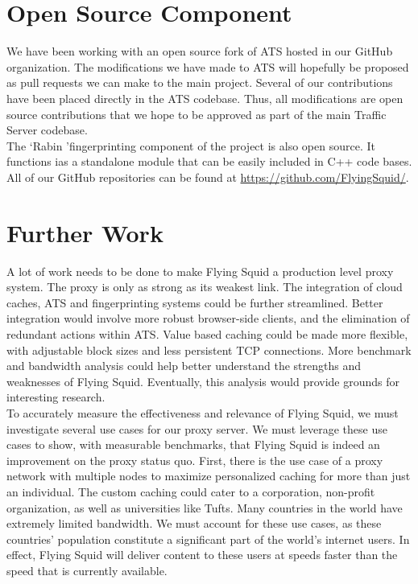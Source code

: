 
\section{Open Source Component}

\noindent
We have been working with an open source fork of ATS hosted in our GitHub organization. The modifications we have made to ATS will hopefully be proposed as pull requests we can make to the main project. Several of our contributions have been placed directly in the ATS codebase. Thus, all modifications are open source contributions that we hope to be approved as part of the main Traffic Server codebase. \\

\noindent
The \lq Rabin \rq fingerprinting component of the project is also open source. It functions ias a standalone module that can be easily included in C++ code bases.\\

\noindent
All of our GitHub repositories can be found at \url{https://github.com/FlyingSquid/}.

\section{Further Work}

\noindent
A lot of work needs to be done to make Flying Squid a production level proxy system. The proxy is only as strong as its weakest link. The integration of cloud caches, ATS and fingerprinting systems could be further streamlined. Better integration would involve more robust browser-side clients, and the elimination of redundant actions within ATS. Value based caching could be made more flexible, with adjustable block sizes and less persistent TCP connections. More benchmark and bandwidth analysis could help better understand the strengths and weaknesses of Flying Squid. Eventually, this analysis would provide grounds for interesting research.\\

\noindent
To accurately measure the effectiveness and relevance of Flying Squid, we must investigate several use cases for our proxy server. We must leverage these use cases to show, with measurable benchmarks, that Flying Squid is indeed an improvement on the proxy status quo. First, there is the use case of a proxy network with multiple nodes to maximize personalized caching for more than just an individual. The custom caching could cater to a corporation, non-profit organization, as well as universities like Tufts. 
Many countries in the world have extremely limited bandwidth. We must account for these use cases, as these countries’ population constitute a significant part of the world’s internet users. In effect, Flying Squid will deliver content to these users at speeds faster than the speed that is currently available.








